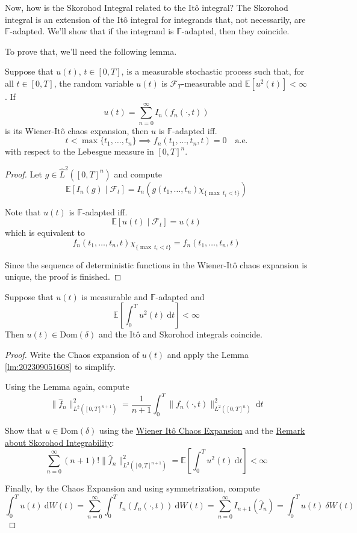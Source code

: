 Now, how is the Skorohod Integral related to the Itô integral? The Skorohod integral is an extension of the Itô integral for integrands that, not necessarily, are $\mathbb{F}$-adapted. We'll show that if the integrand is $\mathbb{F}$-adapted, then they coincide.

To prove that, we'll need the following lemma.

\begin{lemma}\label{lm:202309051608}
Suppose that $u(t)$, $t \in [0,T]$, is a measurable stochastic process such that, for all $t \in [0,T]$, the random variable $u(t)$ is $\mathcal{F}_T$-measurable and $\mathbb{E}[u^ 2(t)] <\infty$. If 
$$
u(t) = \sum_{n=0}^\infty I_n(f_n(\cdot, t))
$$
is its Wiener-Itô chaos expansion, then $u$ is $\mathbb{F}$-adapted iff.
$$
t < \max \{ t_1, \ldots, t_n \} \implies f_n(t_1, \ldots, t_n, t) = 0 \quad \text{a.e.}
$$
with respect to the Lebesgue measure in $[0,T]^n$.
\end{lemma}

\begin{proof} 
Let $g \in \hat{L}^2([0,T]^n)$ and compute
$$
\mathbb{E}[I_n(g) \mid \mathcal{F}_t] = I_n(g(t_1, \ldots, t_n) \chi_{\{ \max ~t_i < t \}})
$$

Note that $u(t)$ is $\mathbb{F}$-adapted iff.
$$
\mathbb{E}[u(t) \mid \mathcal{F}_t] = u(t)
$$
which is equivalent to 
$$
f_n(t_1, \ldots, t_n, t) \chi_{\{ \max ~t_i < t \}} = f_n(t_1, \ldots, t_n, t)
$$

Since the sequence of deterministic functions in the Wiener-Itô chaos expansion is unique, the proof is finished.
\end{proof}

\begin{theorem}
Suppose that $u(t)$ is measurable and $\mathbb{F}$-adapted and 
$$
\mathbb{E} \left[ \int_0^T u^2(t) ~\mathrm{d}t \right] < \infty
$$
Then $u(t) \in \text{Dom}(\delta)$ and the Itô and Skorohod integrals coincide.
\end{theorem}

\begin{proof}
Write the Chaos expansion of $u(t)$ and apply the Lemma \ref{lm:202309051608} to simplify.

Using the Lemma again, compute  
$$
\| \hat{f}_n \|_{L^2([0,T]^{n+1})}^2 = \frac{1}{n+1} \int_0^T \| f_n(\cdot, t) \|_{L^2([0,T]^n)}^2 ~\mathrm{d}t 
$$

Show that $u \in \text{Dom}(\delta)$ using the \hyperref[thm:chaos-expansion]{Wiener Itô Chaos Expansion} and the \hyperref[rmk:202309060706]{Remark about Skorohod Integrability}:
$$
\sum_{n=0}^\infty (n+1)! \| \hat{f}_n \|_{L^2([0,T]^{n+1})}^2 = \mathbb{E} \left[ \int_0^T u^2(t) ~\mathrm{d}t \right] < \infty
$$

Finally, by the Chaos Expansion and using symmetrization, compute
$$
\int_0^T u(t)~\mathrm{d}W(t) = \sum_{n=0}^\infty \int_0^T I_n(f_n(\cdot, t)) ~\mathrm{d}W(t) = \sum_{n=0}^\infty I_{n+1}(\hat{f}_n) = \int_0^T u(t) ~\delta W(t)
$$
\end{proof}

